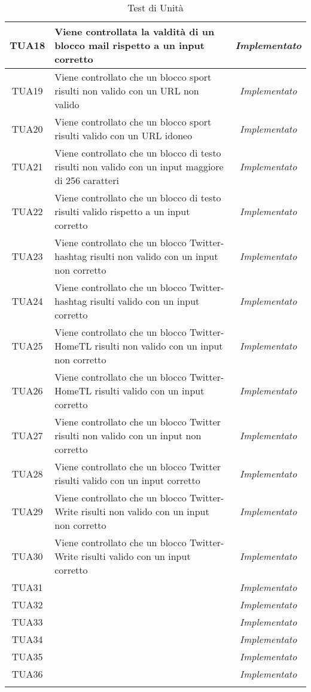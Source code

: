 \begin{longtable}{|c|m{12em}|c|}
TUA18 & Viene controllata la valdità di un blocco mail rispetto a un input corretto & \textit{Implementato}\\ \hline
TUA19 & Viene controllato che un blocco sport risulti non valido con un URL non valido& \textit{Implementato}\\ \hline
TUA20 & Viene controllato che un blocco sport risulti valido con un URL idoneo& \textit{Implementato}\\ \hline
TUA21 & Viene controllato che un blocco di testo risulti non valido con un input maggiore di 256 caratteri& \textit{Implementato}\\ \hline
TUA22 & Viene controllato che un blocco di testo risulti valido rispetto a un input corretto& \textit{Implementato}\\ \hline
TUA23 & Viene controllato che un blocco Twitter-hashtag risulti non valido con un input non corretto& \textit{Implementato}\\ \hline
TUA24 & Viene controllato che un blocco Twitter-hashtag risulti valido con un input corretto& \textit{Implementato}\\ \hline
TUA25 & Viene controllato che un blocco Twitter-HomeTL risulti non valido con un input non corretto& \textit{Implementato}\\ \hline
TUA26 & Viene controllato che un blocco Twitter-HomeTL risulti valido con un input corretto & \textit{Implementato}\\ \hline
TUA27 & Viene controllato che un blocco Twitter risulti non valido con un input non corretto& \textit{Implementato}\\ \hline
TUA28 & Viene controllato che un blocco Twitter risulti valido con un input corretto& \textit{Implementato}\\ \hline
TUA29 & Viene controllato che un blocco Twitter-Write risulti non valido con un input non corretto& \textit{Implementato}\\ \hline
TUA30 & Viene controllato che un blocco Twitter-Write risulti valido con un input corretto& \textit{Implementato}\\ \hline
TUA31 & & \textit{Implementato}\\ \hline
TUA32 & & \textit{Implementato}\\ \hline
TUA33 & & \textit{Implementato}\\ \hline
TUA34 & & \textit{Implementato}\\ \hline
TUA35 & & \textit{Implementato}\\ \hline
TUA36 & & \textit{Implementato}\\ \hline









\caption[Test di Unità]{Test di Unità}
\label{tabella:test2}
\end{longtable}
\clearpage


